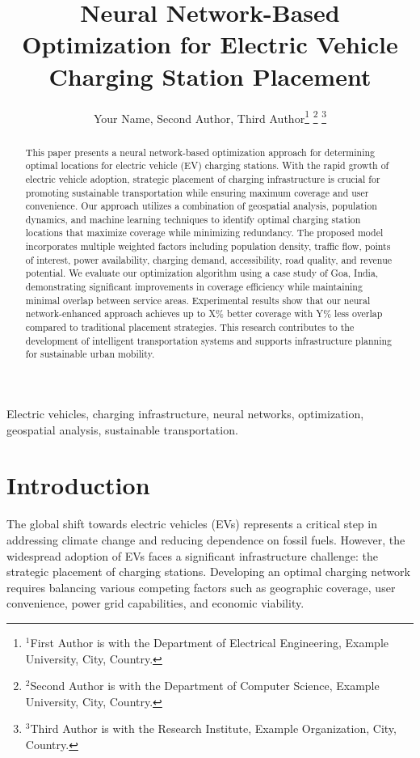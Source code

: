 \documentclass[journal]{IEEEtran}
\begin{document}
\title{Neural Network-Based Optimization for Electric Vehicle Charging Station Placement}

\author{Your Name\footnotemark[1],
        Second Author\footnotemark[2],
        Third Author\footnotemark[3]
\thanks{$^{1}$First Author is with the Department of Electrical Engineering, Example University, City, Country.}
\thanks{$^{2}$Second Author is with the Department of Computer Science, Example University, City, Country.}
\thanks{$^{3}$Third Author is with the Research Institute, Example Organization, City, Country.}
}

\maketitle

\begin{abstract}
This paper presents a neural network-based optimization approach for determining optimal locations for electric vehicle (EV) charging stations. With the rapid growth of electric vehicle adoption, strategic placement of charging infrastructure is crucial for promoting sustainable transportation while ensuring maximum coverage and user convenience. Our approach utilizes a combination of geospatial analysis, population dynamics, and machine learning techniques to identify optimal charging station locations that maximize coverage while minimizing redundancy. The proposed model incorporates multiple weighted factors including population density, traffic flow, points of interest, power availability, charging demand, accessibility, road quality, and revenue potential. We evaluate our optimization algorithm using a case study of Goa, India, demonstrating significant improvements in coverage efficiency while maintaining minimal overlap between service areas. Experimental results show that our neural network-enhanced approach achieves up to X\% better coverage with Y\% less overlap compared to traditional placement strategies. This research contributes to the development of intelligent transportation systems and supports infrastructure planning for sustainable urban mobility.
\end{abstract}

\begin{IEEEkeywords}
Electric vehicles, charging infrastructure, neural networks, optimization, geospatial analysis, sustainable transportation.
\end{IEEEkeywords}

\section{Introduction}
The global shift towards electric vehicles (EVs) represents a critical step in addressing climate change and reducing dependence on fossil fuels. However, the widespread adoption of EVs faces a significant infrastructure challenge: the strategic placement of charging stations. Developing an optimal charging network requires balancing various competing factors such as geographic coverage, user convenience, power grid capabilities, and economic viability.
\end{document}

